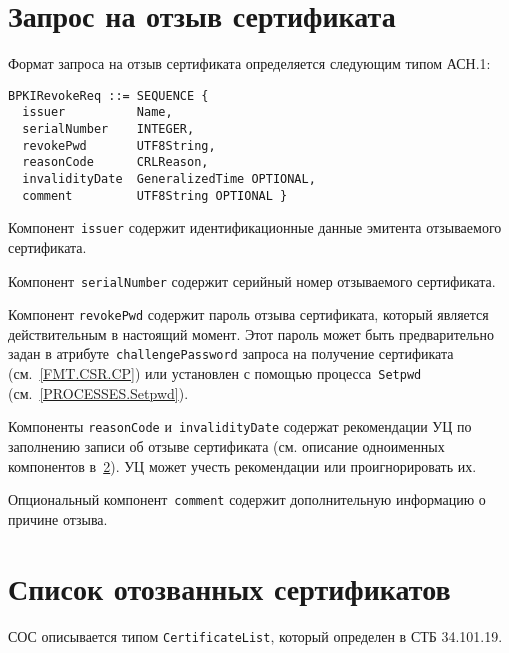 \section{Запрос на отзыв сертификата}\label{FMT.BPKIRevokeReq}

Формат запроса на отзыв сертификата определяется следующим типом АСН.1:
\begin{verbatim}
BPKIRevokeReq ::= SEQUENCE {
  issuer          Name,
  serialNumber    INTEGER,
  revokePwd       UTF8String,
  reasonCode      CRLReason,
  invalidityDate  GeneralizedTime OPTIONAL,
  comment         UTF8String OPTIONAL }
\end{verbatim}

Компонент~\texttt{issuer} содержит идентификационные данные эмитента 
отзываемого сертификата.

Компонент~\texttt{serialNumber} содержит серийный номер отзываемого 
сертификата.

Компонент \texttt{revokePwd} содержит пароль отзыва
сертификата, который является действительным в 
настоящий момент. Этот пароль может быть предварительно
задан в атрибуте~\texttt{challengePassword} запроса на получение сертификата 
(см.~\ref{FMT.CSR.CP}) или установлен с помощью процесса~\texttt{Setpwd} 
(см.~\ref{PROCESSES.Setpwd}). 

Компоненты \texttt{reasonCode} и~\texttt{invalidityDate}
содержат рекомендации УЦ по заполнению записи об отзыве сертификата
(см. описание одноименных компонентов в~\ref{FMT.CRL}).
УЦ может учесть рекомендации или проигнорировать их.

Опциональный компонент~\texttt{comment} содержит дополнительную информацию 
о причине отзыва.
 
\section{Список отозванных сертификатов}\label{FMT.CRL}

СОС описывается типом \texttt{CertificateList}, 
который определен в СТБ 34.101.19.

